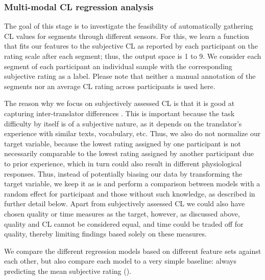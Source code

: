 \documentclass[output=paper]{langsci/langscibook}
\begin{document}
\subsubsection{Multi-modal CL regression analysis}
\label{sec:method-regression}
The goal of this stage is to investigate the feasibility of automatically gathering CL values for segments through different sensors. For this, we learn a function that fits our features to the subjective CL as reported by each participant on the rating scale after each segment; thus, the output space is 1 to 9. We consider each segment of each participant an individual sample with the corresponding subjective rating as a label. Please note that neither a manual annotation of the segments nor an average CL rating across participants is used here.

The reason why we focus on subjectively assessed CL is that it is good at capturing inter-translator differences%
. This is important because the task difficulty by itself is of a subjective nature, as it depends on the translator's experience with similar texts, vocabulary, etc. %
Thus, we also do not normalize our target variable, because the lowest rating assigned by one participant is not necessarily comparable to the lowest rating assigned by another participant due to prior experience, which in turn could also result in different physiological responses.
Thus, instead of potentially biasing our data by transforming the target variable, we keep it as is and perform a comparison between models with a random effect for participant and those without such knowledge, as described in further detail below.
Apart from subjectively assessed CL we could also have chosen quality or time measures as the target, however, as discussed above, quality and CL cannot be considered equal, and time could be traded off for quality, thereby limiting findings based solely on these measures.

We compare the different regression models based on different feature sets against each other, but also compare each model to a very simple baseline: always predicting the mean subjective rating (\baselineCLmean{}).
\end{document}

